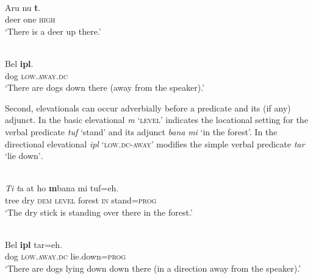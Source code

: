 \documentclass[output=paper]{LSP/langsci}
\begin{document}
\ea%
\label{ex:7:22}
 \\
\gll  Aru   nu  \textbf{{t}}\textbf{{{\textopeno}}}\textbf{{{\ng}}}{.}  \\
   deer  one  \textsc{high}   \\
\glt   `There is a deer up there.'
\z









\ea%
\label{ex:7:23}
 \\
\gll  Bel  \textbf{{ipl}}\textbf{{{\textepsilon}}}{.}  \\
  dog  \textsc{low.away.dc}    \\
\glt   `There are dogs down there (away from the speaker).'
\z







Second, elevationals can occur adverbially before a predicate and its (if any) adjunct. In  the basic elevational \textit{m}\textit{{\textopeno}}\textit{{\ng}} `\textsc{level}' indicates the locational setting for the verbal predicate \textit{tuf} `stand' and its adjunct \textit{bana} \textit{mi} `in the forest'. In  the directional elevational \textit{ipl}\textit{{\textepsilon}} \textsc{`low.dc-away'} modifies the simple verbal predicate \textit{tar} `lie down'\textsc{.} 



\ea%
\label{ex:7:24}
 \\
\gll  \textit{Ti} \textit ta {{\textglotstop}}{at}  ho  \textbf{{m}}\textbf{{{\textopeno}}}\textbf{{{\ng}}}{bana}  mi  {tuf=eh.} \\
    tree  dry  \textsc{dem} \textsc {level} forest  \textsc{in} stand=\textsc{prog} \\
\glt   `The dry stick is standing over there in the forest.'
\z









\ea%
\label{ex:7:25}
 \\
\gll   Bel  \textbf{ipl}\textbf{\textepsilon} tar=eh. \\
   dog  \textsc{low.away.dc} lie.down=\textsc{prog}   \\
\glt   `There are dogs lying down down there (in a direction away from the speaker).' 
\z
\end{document}
